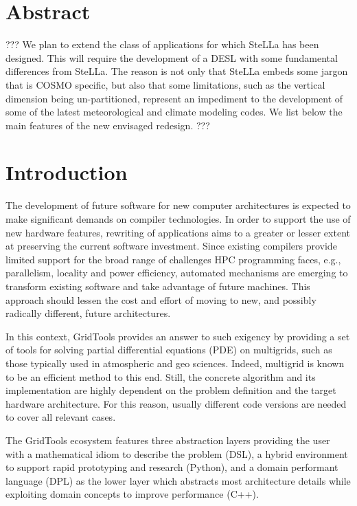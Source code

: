 \documentclass[english]{article}
\begin{document}
\section{Abstract}
???
 We plan to extend the class of applications for which SteLLa has been designed. This will require the development of a DESL with some fundamental differences from SteLLa. The reason is not only that SteLLa embeds some jargon that is COSMO specific, but also that some limitations, such as the vertical dimension being un-partitioned, represent an impediment to the development of some of the latest meteorological and climate modeling codes. We list below the main features of the new envisaged redesign.
???



\section{Introduction}
The development of future software for new computer architectures is expected to make significant demands on compiler technologies.
In order to support the use of new hardware features, rewriting of applications aims to a greater or lesser extent at preserving the current software investment.
Since existing compilers provide limited support for the broad range of challenges HPC programming faces, e.g., parallelism, locality and power efficiency, automated mechanisms are emerging to transform existing software and take advantage of future machines.
This approach should lessen the cost and effort of moving to new, and possibly radically different, future architectures.

In this context, GridTools provides an answer to such exigency by providing a set of tools for solving partial differential equations (PDE) on multigrids, such as those typically used in atmospheric and geo sciences.
Indeed, multigrid is known to be an efficient method to this end.
Still, the concrete algorithm and its implementation are highly dependent on the problem definition and the target hardware architecture.
For this reason, usually different code versions are needed to cover all relevant cases.

The GridTools ecosystem features three abstraction layers providing the user with a mathematical idiom to describe the problem (DSL), a hybrid environment to support rapid prototyping and research (Python), and a domain performant language (DPL) as the lower layer which abstracts most architecture details while exploiting domain concepts to improve performance (C++).
\end{document}
